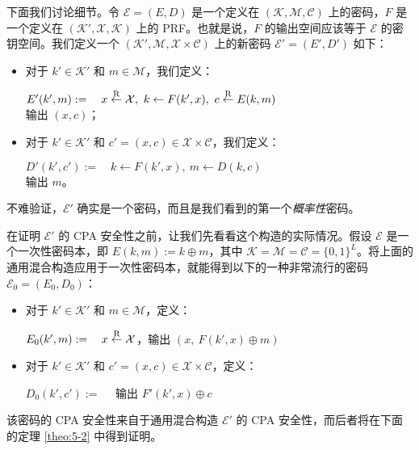 下面我们讨论细节。令 $\mathcal{E}=(E,D)$ 是一个定义在 $(\mathcal{K},\mathcal{M},\mathcal{C})$ 上的密码，$F$ 是一个定义在 $(\mathcal{K}',\mathcal{X},\mathcal{K})$ 上的 PRF。也就是说，$F$ 的输出空间应该等于 $\mathcal{E}$ 的密钥空间。我们定义一个 $(\mathcal{K}',\mathcal{M},\mathcal{X}\times\mathcal{C})$ 上的新密码 $\mathcal{E}'=(E',D')$ 如下：
\begin{itemize}
	\item 对于 $k'\in\mathcal{K}'$ 和 $m\in\mathcal{M}$，我们定义：
	
	\hspace*{20pt} $E'(k',m):=\quad x\overset{\rm R}\leftarrow\mathcal{X},\ k\leftarrow F(k',x),\ c\overset{\rm R}\leftarrow E(k,m)$\\
	\hspace*{88pt} 输出 $(x,c)$；
	\item 对于 $k'\in\mathcal{K}'$ 和 $c'=(x,c)\in\mathcal{X}\times\mathcal{C}$，我们定义：
	
	\hspace*{20pt} $D'(k',c'):=\quad k\leftarrow F(k',x),\ m\leftarrow D(k,c)$\\
	\hspace*{88pt} 输出 $m$。
\end{itemize}    

不难验证，$\mathcal{E}'$ 确实是一个密码，而且是我们看到的第一个\emph{概率性}密码。

\begin{example}\label{exmp:5-2}
在证明 $\mathcal{E}'$ 的 CPA 安全性之前，让我们先看看这个构造的实际情况。假设 $\mathcal{E}$ 是一个一次性密码本，即 $E(k,m):=k\oplus m$，其中 $\mathcal{K}=\mathcal{M}=\mathcal{C}=\{0,1\}^L$。将上面的通用混合构造应用于一次性密码本，就能得到以下的一种非常流行的密码 $\mathcal{E}_0=(E_0,D_0)$：
\begin{itemize}
	\item 对于 $k'\in\mathcal{K}'$ 和 $m\in\mathcal{M}$，定义：
	
	\hspace*{20pt} $E_0(k',m):=\quad x\overset{\rm R}\leftarrow\mathcal{X}$，输出 $(x,\ F(k',x)\oplus m)$
	\item 对于 $k'\in\mathcal{K}'$ 和 $c'=(x,c)\in\mathcal{X}\times\mathcal{C}$，定义：
	
	\hspace*{20pt} $D_0(k',c'):=\quad$ 输出 $F'(k',x)\oplus c$
\end{itemize}
该密码的 CPA 安全性来自于通用混合构造 $\mathcal{E}'$ 的 CPA 安全性，而后者将在下面的定理 \ref{theo:5-2} 中得到证明。
\end{example}

